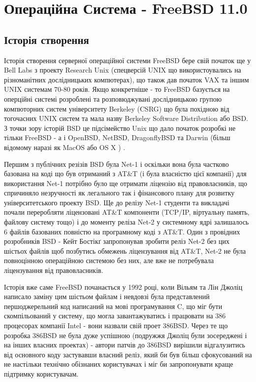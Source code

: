 \section{Операційна Система - FreeBSD 11.0}

  \subsection{Історія створення}
Історія створення серверної операційної системи FreeBSD бере свій початок ще у Bell Labs з проекту Research Unix (спецверсій UNIX що використоувались на різноманітних дослідницьких компютерах), що також дав початок VAX та іншим UNIX системам 70-80 років. Якщо конкретніше - то FreeBSD базується на оперційні системі розроблені та розповюджувані дослідницькою групою компюторних систем університету Berkeley (CSRG) що була похідною від тогочасних UNIX систем та
мала назву Berkeley Software Distribution або BSD. З точки зору історій BSD це підсімейство Unix що дало початок розробкі не тільки FreeBSD - а і OpenBSD, NetBSD, DragonflyBSD та Darwin (більш відомому наразі як MacOS або OS X ) .

Першим з публічних резізів BSD була Net-1 і оскільки вона була частково базована на коді що був отриманий з AT\&T (і була власністю цієї компанії) для використання Net-1 потрібно було ще отримати ліцензію від правовласників, що спричиняло незручності як легального так і фінансового плану для розвитку університетського проекту BSD. Ще до релізу Net-1 студенти та викладачі почали переробляти ліцензовані AT\&T компоненти (TCP/IP, віртуальну память, файлову систему тощо) і до моменту реліза Net-2 у системному ядрі залишалось 6 файлів базованих повністю на програмному коді з AT\&T. Один з провідних розробників BSD - Кейт Бостікґ запропонував зробити реліз Net-2 без цих шістьох файлів щоб позбутись обмежень ліцензування від AT\&T, Net-2 не була повноцінною операційною системою без них, але вже не потребувала ліцензування від правовласників.

Історія вже саме FreeBSD почанається у 1992 році, коли Вільям та Лін Джоліц написало заміну цим шістьом файлам і невдовзі була представлений першоджерельний код написаний на мові програмування C, що міг бути скомпільований у систему, що могла завантажуватись і працювати на 386 процесорах компанії Intel - вони назвали свій проет 386BSD. Через те що розробка 386BSD не була дуже успішною (подружжя Джоліц були зосереджені і на інших власних проектах) - автори патчів до 386BSD вирішили відгалузитись від основного коду застувавши власний реліз, який би був більш сфокусований на не настільки технічно обізнаних користувачах і міг би запропонувати краще підтримку користувачам.

